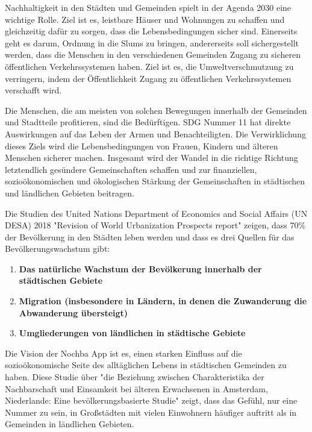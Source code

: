 Nachhaltigkeit in den Städten und Gemeinden spielt in der Agenda 2030 eine wichtige Rolle. Ziel ist es, leistbare Häuser und Wohnungen zu schaffen und gleichzeitig dafür zu sorgen, dass die Lebensbedingungen sicher sind. Einerseits geht es darum, Ordnung in die Slums zu bringen, andererseits soll sichergestellt werden, dass die Menschen in den verschiedenen Gemeinden Zugang zu sicheren öffentlichen Verkehrssystemen haben. Ziel ist es, die Umweltverschmutzung zu verringern, indem der Öffentlichkeit Zugang zu öffentlichen Verkehrssystemen verschafft wird.

Die Menschen, die am meisten von solchen Bewegungen innerhalb der Gemeinden und Stadtteile profitieren, sind die Bedürftigen. SDG Nummer 11 hat direkte Auswirkungen auf das Leben der Armen und Benachteiligten. Die Verwirklichung dieses Ziels wird die Lebensbedingungen von Frauen, Kindern und älteren Menschen sicherer machen. Insgesamt wird der Wandel in die richtige Richtung letztendlich gesündere Gemeinschaften schaffen und zur finanziellen, sozioökonomischen und ökologischen Stärkung der Gemeinschaften in städtischen und ländlichen Gebieten beitragen.

Die Studien des United Nations Department of Economics and Social Affairs (UN DESA) 2018 "Revision of World Urbanization Prospects report" \cite{Worlds-Urbanization-Prospects} zeigen, dass 70\% der Bevölkerung in den Städten leben werden und dass es drei Quellen für das Bevölkerungswachstum gibt:

\begin{enumerate}
    \item \textbf{Das natürliche Wachstum der Bevölkerung innerhalb der städtischen Gebiete}
    \item \textbf{Migration (insbesondere in Ländern, in denen die Zuwanderung die Abwanderung übersteigt)}
    \item \textbf{Umgliederungen von ländlichen in städtische Gebiete}
\end{enumerate}

Die Vision der Nochba App ist es, einen starken Einfluss auf die sozioökonomische Seite des alltäglichen Lebens in städtischen Gemeinden zu haben. Diese Studie über "die Beziehung zwischen Charakteristika der Nachbarschaft und Einsamkeit bei älteren Erwachsenen in Amsterdam, Niederlande: Eine bevölkerungsbasierte Studie" \cite{neighbourhood-characteristics-and-loneliness} zeigt, dass das Gefühl, nur eine Nummer zu sein, in Großstädten mit vielen Einwohnern häufiger auftritt als in Gemeinden in ländlichen Gebieten.


